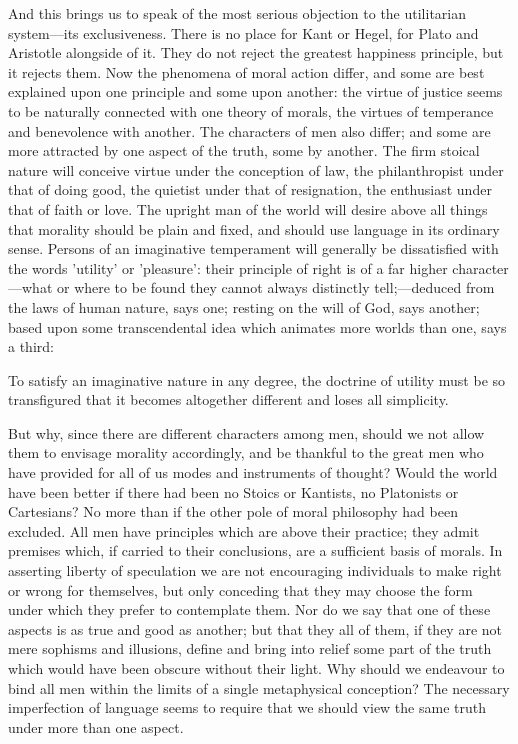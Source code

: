 \documentclass[11pt,letter]{article}
\begin{document}
\par  And this brings us to speak of the most serious objection to the utilitarian system—its exclusiveness. There is no place for Kant or Hegel, for Plato and Aristotle alongside of it. They do not reject the greatest happiness principle, but it rejects them. Now the phenomena of moral action differ, and some are best explained upon one principle and some upon another: the virtue of justice seems to be naturally connected with one theory of morals, the virtues of temperance and benevolence with another. The characters of men also differ; and some are more attracted by one aspect of the truth, some by another. The firm stoical nature will conceive virtue under the conception of law, the philanthropist under that of doing good, the quietist under that of resignation, the enthusiast under that of faith or love. The upright man of the world will desire above all things that morality should be plain and fixed, and should use language in its ordinary sense. Persons of an imaginative temperament will generally be dissatisfied with the words 'utility' or 'pleasure': their principle of right is of a far higher character—what or where to be found they cannot always distinctly tell;—deduced from the laws of human nature, says one; resting on the will of God, says another; based upon some transcendental idea which animates more worlds than one, says a third:
 
\par  To satisfy an imaginative nature in any degree, the doctrine of utility must be so transfigured that it becomes altogether different and loses all simplicity.

\par  But why, since there are different characters among men, should we not allow them to envisage morality accordingly, and be thankful to the great men who have provided for all of us modes and instruments of thought? Would the world have been better if there had been no Stoics or Kantists, no Platonists or Cartesians? No more than if the other pole of moral philosophy had been excluded. All men have principles which are above their practice; they admit premises which, if carried to their conclusions, are a sufficient basis of morals. In asserting liberty of speculation we are not encouraging individuals to make right or wrong for themselves, but only conceding that they may choose the form under which they prefer to contemplate them. Nor do we say that one of these aspects is as true and good as another; but that they all of them, if they are not mere sophisms and illusions, define and bring into relief some part of the truth which would have been obscure without their light. Why should we endeavour to bind all men within the limits of a single metaphysical conception? The necessary imperfection of language seems to require that we should view the same truth under more than one aspect.
\end{document}

